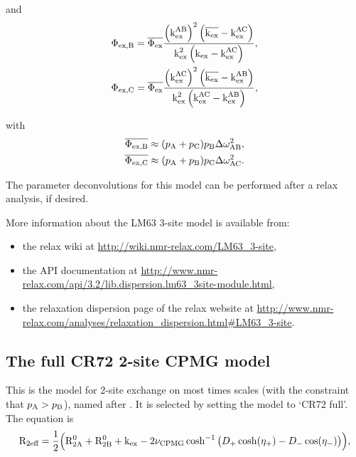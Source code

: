 and
\begin{subequations}
\begin{align}
    &\Phi_{\textrm{ex,B}} = \overline{\Phi_{\textrm{ex}}} \frac{\left(\textrm{k}_{\textrm{ex}}^{\textrm{AB}}\right)^2 \left( \overline{\textrm{k}_{\textrm{ex}}} - \textrm{k}_{\textrm{ex}}^{\textrm{AC}} \right)}{\textrm{k}_{\textrm{ex}}^2 \left( \textrm{k}_{\textrm{ex}} - \textrm{k}_{\textrm{ex}}^{\textrm{AC}} \right)} , \label{eq: disp phiexB} \\
    &\Phi_{\textrm{ex,C}} = \overline{\Phi_{\textrm{ex}}} \frac{\left(\textrm{k}_{\textrm{ex}}^{\textrm{AC}}\right)^2 \left( \overline{\textrm{k}_{\textrm{ex}}} - \textrm{k}_{\textrm{ex}}^{\textrm{AB}} \right)}{\textrm{k}_{\textrm{ex}}^2 \left( \textrm{k}_{\textrm{ex}}^{\textrm{AC}} - \textrm{k}_{\textrm{ex}}^{\textrm{AB}} \right)} , \label{eq: disp phiexC}
\end{align}
\end{subequations}

with
\begin{subequations}
\begin{align}
    &\overline{\Phi_{\textrm{ex,B}}} \approx (p_{\textrm{A}} + p_{\textrm{C}}) p_{\textrm{B}} \Delta\omega_{\textrm{AB}}^2 , \\
    &\overline{\Phi_{\textrm{ex,C}}} \approx (p_{\textrm{A}} + p_{\textrm{B}}) p_{\textrm{C}} \Delta\omega_{\textrm{AC}}^2 .
\end{align}
\end{subequations}

The parameter deconvolutions for this model can be performed after a relax analysis, if desired.

More information about the LM63 3-site model is available from:
\begin{itemize}
  \item the relax wiki at \url{http://wiki.nmr-relax.com/LM63\_3-site},
  \item the API documentation at \url{http://www.nmr-relax.com/api/3.2/lib.dispersion.lm63\_3site-module.html},
  \item the relaxation dispersion page of the relax website at \url{http://www.nmr-relax.com/analyses/relaxation\_dispersion.html#LM63\_3-site}.
\end{itemize}



\subsection{The full CR72 2-site CPMG model}
\label{sect: dispersion: CR72 full model}

This is the model for 2-site exchange on most times scales (with the constraint that $p_{\textrm{A}} > p_{\textrm{B}}$), named after \citet{CarverRichards72}.
It is selected by setting the model to `CR72 full'.
The equation is
\begin{equation}
    \mathrm{R}_{\textrm{2eff}} = \frac{1}{2} \Big( \mathrm{R}_{\mathrm{2A}}^0 + \mathrm{R}_{\mathrm{2B}}^0 + \textrm{k}_{\textrm{ex}} - 2\nu_{\textrm{CPMG}}\cosh^{-1} \big( D_+\cosh(\eta_+) - D_-\cos(\eta_-) \big) \Big) ,
\end{equation}

